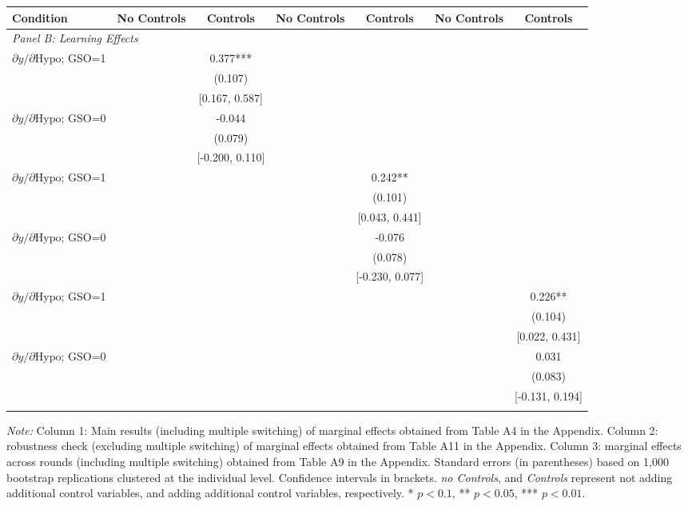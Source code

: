 \documentclass[12pt]{article}
\begin{document}
\begin{table}[H]
\begin{tabular}{l*{6}{c}}
Condition & No Controls & Controls & No Controls & Controls & No Controls & Controls \\
\midrule
\multicolumn{7}{l}{\textit{Panel B: Learning Effects }} \\
\addlinespace[1em]
$\partial y/\partial \text{Hypo}$; GSO=1 & & 0.377***& & & &  \\
 & &(0.107) & & & &  \\
 & &[0.167, 0.587] & & & &  \\
\addlinespace[0.5em]
$\partial y/\partial \text{Hypo}$; GSO=0 & & -0.044& & & &  \\
 & &(0.079) & & & &  \\
 & &[-0.200, 0.110] & & & &  \\
\addlinespace[0.5em]
$\partial y/\partial \text{Hypo}$; GSO=1 & &  & &0.242** & & \\
 & & & &(0.101) & &  \\
 & & & &[0.043, 0.441] & &  \\
\addlinespace[0.5em]
$\partial y/\partial \text{Hypo}$; GSO=0 & & & & -0.076& &  \\
 & & & &(0.078) & &  \\
 & & & &[-0.230, 0.077] & &  \\
\addlinespace[0.5em]
$\partial y/\partial \text{Hypo}$; GSO=1 & & & & & & 0.226** \\
 & & & & & & (0.104) \\
 & & & & & & [0.022, 0.431] \\
\addlinespace[0.5em]
$\partial y/\partial \text{Hypo}$; GSO=0 & & & & & & 0.031 \\
 & & & & & & (0.083) \\
 & & & & & & [-0.131, 0.194] \\
\addlinespace[0.5em]
\bottomrule
\end{tabular}
\begin{tablenotes}[flushleft]
\small
\item \textit{Note:} Column 1: Main results (including multiple switching) of marginal effects obtained from Table A4 in the Appendix. Column 2: robustness check (excluding multiple switching) of marginal effects obtained from Table A11 in the Appendix. Column 3: marginal effects across rounds (including multiple switching) obtained from Table A9 in the Appendix. Standard errors (in parentheses) based on 1,000 bootstrap replications clustered at the individual level. Confidence intervals in brackets. \textit{no Controls}, and \textit{Controls} represent not adding additional control variables, and adding additional control variables, respectively. * $p<0.1$, ** $p<0.05$, *** $p<0.01$.
\end{tablenotes}
\label{tab:results}
\end{table}
\fi
\end{document}

